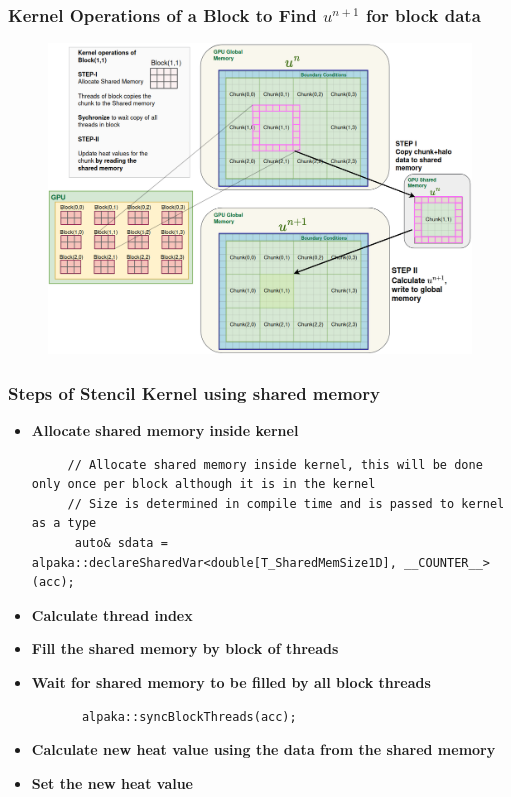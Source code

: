 \documentclass[9pt]{beamer}
\begin{document}
\begin{frame}
\frametitle{Kernel Operations of a Block to Find $u^{n+1}$ for block data}
\begin{figure}
    \centering
    \includegraphics[width=0.9\linewidth]{Screenshot from 2024-10-01 12-57-11.png}
    \label{fig:enter-label}
\end{figure}
\end{frame}

\begin{frame}[fragile]
\frametitle{Steps of Stencil Kernel using shared memory}
\begin{itemize}
    \item \textbf{Allocate shared memory inside kernel}
   \lstset{basicstyle=\ttfamily\scriptsize}
     \begin{lstlisting}
     // Allocate shared memory inside kernel, this will be done only once per block although it is in the kernel
     // Size is determined in compile time and is passed to kernel as a type
      auto& sdata = alpaka::declareSharedVar<double[T_SharedMemSize1D], __COUNTER__>(acc);
        \end{lstlisting}
 \item \textbf{Calculate thread index}
  \item \textbf{Fill the shared memory by block of threads}
 \item \textbf{Wait for shared memory to be filled by all block threads}
 \begin{lstlisting}
       alpaka::syncBlockThreads(acc);
   \end{lstlisting}
 \item \textbf{Calculate new heat value using the data from the shared memory}
 \item \textbf{Set the new heat value}
 \end{itemize}
\end{frame}
\end{document}
